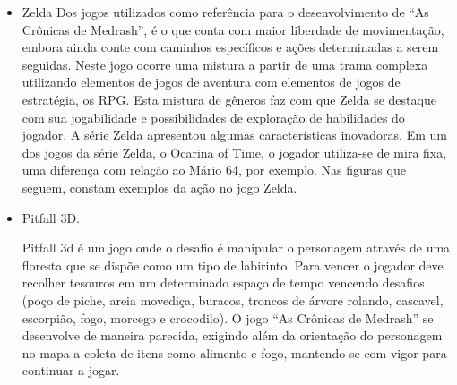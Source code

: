 \begin{itemize}


\item Zelda
Dos jogos utilizados como referência para o desenvolvimento de
 ``As Crônicas de Medrash'',
é o que conta com maior liberdade de movimentação, embora ainda conte com 
caminhos específicos e ações determinadas a serem seguidas.
Neste jogo ocorre uma mistura a partir de uma trama complexa utilizando 
elementos de jogos de aventura com elementos de jogos de estratégia, os RPG. 
Esta mistura de gêneros faz com que Zelda se destaque com sua jogabilidade e
 possibilidades de exploração de habilidades do jogador. 
A série Zelda apresentou algumas características inovadoras. Em um dos jogos
 da série Zelda, o Ocarina of Time, o jogador utiliza-se de mira fixa, uma diferença 
com relação ao Mário 64, por exemplo.
Nas figuras que seguem, constam exemplos da ação no jogo Zelda.



\item Pitfall 3D.

Pitfall 3d
 é um jogo onde o desafio é manipular o personagem através de uma floresta 
que se dispõe como um tipo de labirinto. Para vencer o jogador deve recolher 
tesouros em um determinado espaço de tempo vencendo desafios (poço de piche, 
areia movediça, buracos, troncos de árvore rolando, cascavel, escorpião, fogo, 
morcego e crocodilo).
O jogo ``As Crônicas de Medrash'' se desenvolve de maneira parecida, exigindo 
além da orientação do personagem no mapa a coleta de itens como alimento e fogo,
 mantendo-se com vigor para continuar a jogar.


\end{itemize}
